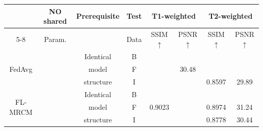 \documentclass[letterpaper]{article} %
\newcommand{\xmark}{\ding{55}}%
\begin{document}
\begin{table}
\centering
\resizebox{\columnwidth}{!}
{
\begin{tabular}{cccc|cc|cc}
\toprule
&\multirow{2}{*}{NO shared } &\multirow{3}{*}{Prerequisite}
&Test &\multicolumn{2}{c|}{{{T1-weighted}}} &\multicolumn{2}{c}{{{T2-weighted}}}  \\
\cmidrule{5-8}
&Param. &  &{Data} &{SSIM$\uparrow$} &{PSNR$\uparrow$} &{SSIM$\uparrow$} &{PSNR$\uparrow$}  \\
\midrule
\multirow{3}{*}{FedAvg}
&\multirow{3}{*}{\xmark} %
&{Identical} &\cellcolor{gray0}B &\cellcolor{gray0}{0.9317} &\cellcolor{gray0}{34.91}
&\cellcolor{gray0}{0.9173} &\cellcolor{gray0}{30.68}
\\
& &{model}  &\cellcolor{gray1}F  &\cellcolor{gray1}{0.8803} &\cellcolor{gray1}30.48 &\cellcolor{gray1}{0.8782} &\cellcolor{gray1}{30.09} \\
& &{structure} &\cellcolor{gray2}I &\cellcolor{gray2}{0.9232} &\cellcolor{gray2}{32.31} &\cellcolor{gray2}0.8597 &\cellcolor{gray2}29.89 \\
\midrule

\multirow{3}{*}{FL-MRCM}
&\multirow{3}{*}{\xmark} %
&{Identical} &\cellcolor{gray0}B &\cellcolor{gray0}{0.9577} &\cellcolor{gray0}{36.88}
&\cellcolor{gray0}{0.9308} &\cellcolor{gray0}{34.28}
\\
& &{model} &\cellcolor{gray1}F &\cellcolor{gray1}0.9023 &\cellcolor{gray1}{33.63} &\cellcolor{gray1}0.8974 &\cellcolor{gray1}31.24 \\
& &{structure} &\cellcolor{gray2}I &\cellcolor{gray2}{0.9362} &\cellcolor{gray2}{33.29} &\cellcolor{gray2}0.8778 &\cellcolor{gray2}30.44  \\
\midrule \midrule


\end{tabular}}
\end{table}
\end{document}
